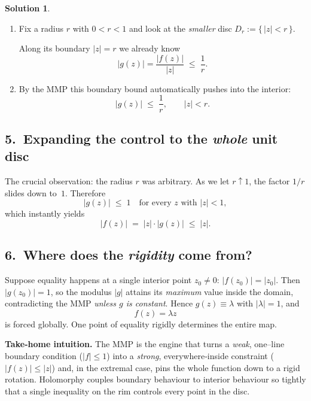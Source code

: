 \documentclass[12pt]{article}
\theoremstyle{definition} %
\newtheorem{solution}{Solution}
\theoremstyle{plain} %
\begin{document}
\begin{solution}
   \begin{enumerate}[label=\textbf{\alph*.},wide,labelwidth=!, labelindent=0pt]
     \item Fix a radius $r$ with $0<r<1$ and look at the \emph{smaller} disc
           $D_r:=\{\,|z|<r\,\}$.\par
           \vskip4pt
           Along its boundary $|z|=r$ we already know
           \[
              |g(z)| = \frac{|f(z)|}{|z|}
                      \;\le\; \frac{1}{r}.
           \]
     \item By the MMP this boundary bound automatically pushes into the interior:
           \[
              |g(z)|\;\le\;\frac{1}{r},
              \qquad |z|<r.
           \]
   \end{enumerate}
   
   \medskip
   \subsection*{5.\  Expanding the control to the \emph{whole} unit disc}
   
   The crucial observation: the radius $r$ was arbitrary.  
   As we let $r\uparrow1$, the factor $1/r$ slides down to~$1$.  
   Therefore
   \[
      |g(z)|\;\le\;1
      \quad\text{for every } z\text{ with }|z|<1,
   \]
   which instantly yields
   \[
      |f(z)| \;=\; |z|\cdot|g(z)|
                 \;\le\; |z|.
   \]
   
   \medskip
   \subsection*{6.\  Where does the \emph{rigidity} come from?}
   
   Suppose equality happens at a single interior point $z_0\neq0$:
   $|f(z_0)|=|z_0|$.  
   Then $|g(z_0)|=1$, so the modulus $|g|$ attains its \emph{maximum} value
   inside the domain, contradicting the MMP \emph{unless $g$ is constant}.
   Hence $g(z)\equiv\lambda$ with $|\lambda|=1$, and
   \[
      f(z)=\lambda z
   \]
   is forced globally.  
   One point of equality rigidly determines the entire map.
   
   \bigskip
   \noindent
   \textbf{Take‑home intuition.}\;
   The MMP is the engine that turns a \emph{weak}, one–line boundary
   condition ($|f|\le1$) into a \emph{strong}, everywhere‑inside constraint
   ($|f(z)|\le|z|$) and, in the extremal case, pins the whole function down
   to a rigid rotation.  Holomorphy couples boundary behaviour to interior
   behaviour so tightly that a single inequality on the rim controls every
   point in the disc.
   
   \end{solution}
\end{document}
